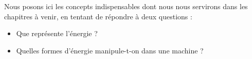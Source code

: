 Nous posons ici les concepts indispensables dont nous nous servirons dans les chapitres à venir, en tentant de répondre à deux questions :
\begin{itemize}
	\item Que représente l’énergie ?
	\item Quelles formes d’énergie manipule-t-on dans une machine ?
\end{itemize}
